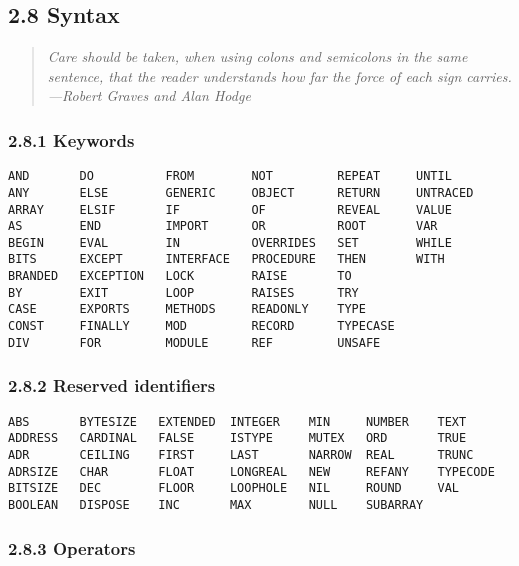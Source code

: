 \documentclass[10pt]{article}
\begin{document}
\subsection*{2.8 Syntax}

\begin{quote}
  \emph{ Care should be taken, when using colons and semicolons in the same
    sentence, that the reader understands how far the force of each sign
    carries.  ---Robert Graves and Alan Hodge }
\end{quote}

\subsubsection*{2.8.1 Keywords}

\begin{verbatim}
AND       DO          FROM        NOT         REPEAT     UNTIL
ANY       ELSE        GENERIC     OBJECT      RETURN     UNTRACED
ARRAY     ELSIF       IF          OF          REVEAL     VALUE
AS        END         IMPORT      OR          ROOT       VAR
BEGIN     EVAL        IN          OVERRIDES   SET        WHILE
BITS      EXCEPT      INTERFACE   PROCEDURE   THEN       WITH
BRANDED   EXCEPTION   LOCK        RAISE       TO
BY        EXIT        LOOP        RAISES      TRY
CASE      EXPORTS     METHODS     READONLY    TYPE
CONST     FINALLY     MOD         RECORD      TYPECASE
DIV       FOR         MODULE      REF         UNSAFE
\end{verbatim}

\subsubsection*{2.8.2 Reserved identifiers}

\begin{verbatim}
ABS       BYTESIZE   EXTENDED  INTEGER    MIN     NUMBER    TEXT
ADDRESS   CARDINAL   FALSE     ISTYPE     MUTEX   ORD       TRUE
ADR       CEILING    FIRST     LAST       NARROW  REAL      TRUNC
ADRSIZE   CHAR       FLOAT     LONGREAL   NEW     REFANY    TYPECODE
BITSIZE   DEC        FLOOR     LOOPHOLE   NIL     ROUND     VAL
BOOLEAN   DISPOSE    INC       MAX        NULL    SUBARRAY
\end{verbatim}

\subsubsection*{2.8.3 Operators}
\end{document}

